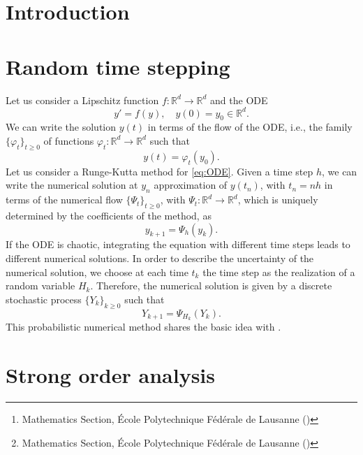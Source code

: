 \documentclass{siamart1116}
\title{{\TheTitle}}
\author{Assyr Abdulle\thanks{Mathematics Section, \'Ecole Polytechnique F\'ed\'erale de Lausanne (\email{assyr.abdulle@epfl.ch})}
	\and
	Giacomo Garegnani\thanks{Mathematics Section, \'Ecole Polytechnique F\'ed\'erale de Lausanne (\email{giacomo.garegnani@epfl.ch})}}
\numberwithin{theorem}{section}
\renewcommand{\phi}{\varphi}
\newcommand{\R}{\mathbb{R}}
\begin{document}
	
\maketitle	

\begin{abstract}
\end{abstract}

\section{Introduction}

\section{Random time stepping}

Let us consider a Lipschitz function $f\colon\R^d\to\R^d$ and the ODE
\begin{equation}\label{eq:ODE}
	y' = f(y), \quad y(0) = y_0 \in \R^d.
\end{equation}
We can write the solution $y(t)$ in terms of the flow of the ODE, i.e., the family $\{\phi_t\}_{t \geq 0}$ of functions $\phi_t\colon\R^d\to\R^d$ such that 
\begin{equation}
	y(t) = \phi_t(y_0).
\end{equation}
Let us consider a Runge-Kutta method for \eqref{eq:ODE}. Given a time step $h$, we can write the numerical solution at $y_n$ approximation of $y(t_n)$, with $t_n = nh$ in terms of the numerical flow $\{\Psi_t\}_{t \geq 0}$, with $\Psi_t\colon\R^d\to\R^d$, which is uniquely determined by the coefficients of the method, as
\begin{equation}
	y_{k+1} = \Psi_h(y_k).
\end{equation}
If the ODE is chaotic, integrating the equation with different time steps leads to different numerical solutions. In order to describe the uncertainty of the numerical solution, we choose at each time $t_k$ the time step as the realization of a random variable $H_k$. Therefore, the numerical solution is given by a discrete stochastic process $\{Y_k\}_{k\geq 0}$ such that
\begin{equation}\label{eq:ProbMethVarH}
	Y_{k+1} = \Psi_{H_k}(Y_k).
\end{equation}
This probabilistic numerical method shares the basic idea with \cite{CGS16}. 

\section{Strong order analysis}
\end{document}
